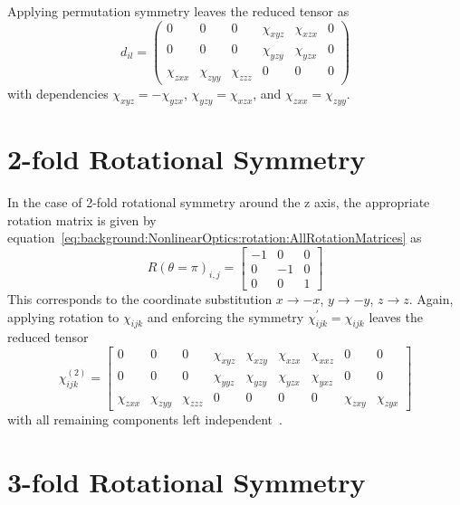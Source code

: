 Applying permutation symmetry leaves the reduced tensor as
\begin{equation}\label{eq:Reduced4fold}
	d_{il} = 
	\begin{pmatrix}
		0 & 0 & 0 & \chi_{xyz} & \chi_{xzx} & 0\\ 
		0 & 0 & 0 & \chi_{yzy} & \chi_{yzx} & 0\\ 
		\chi_{zxx} & \chi_{zyy} & \chi_{zzz} & 0 & 0 & 0
	\end{pmatrix} 
\end{equation}
with dependencies $\chi_{xyz} = -\chi_{yzx}$, $\chi_{yzy} = \chi_{xzx}$, and $\chi_{zxx} = \chi_{zyy}$.


\section{2-fold Rotational Symmetry}\label{sec:appendix:rotations:2foldrot}

In the case of 2-fold rotational symmetry around the z axis, the appropriate rotation matrix is given by equation~\ref{eq:background:NonlinearOptics:rotation:AllRotationMatrices} as
\begin{equation}\label{eq:piRotationMatrix}
	R(\theta=\pi)_{i,j} =
	\begin{bmatrix}
		-1 & 0 & 0\\ 
		0 & -1 & 0\\ 
		0 & 0 & 1
	\end{bmatrix}
\end{equation}
This corresponds to the coordinate substitution $x\rightarrow-x$, $y\rightarrow-y$, $z\rightarrow z$. Again, applying rotation to $\chi_{ijk}$ and enforcing the symmetry $\chi_{ijk}^{\prime}=\chi_{ijk}$ leaves the reduced tensor
\begin{equation}\label{eq:2foldChi}
	\chi^{(2)}_{ijk} =
	\begin{bmatrix}
		0 & 0 & 0 & \chi_{xyz} & \chi_{xzy} & \chi_{xzx} & \chi_{xxz} & 0 & 0\\ 
		0 & 0 & 0 & \chi_{yyz} & \chi_{yzy} & \chi_{yzx} & \chi_{yxz} & 0 & 0\\ 
		\chi_{zxx} & \chi_{zyy} & \chi_{zzz} & 0 & 0 & 0 & 0 & \chi_{zxy} & \chi_{zyx}
	\end{bmatrix}
\end{equation}
with all remaining components left independent~\cite{Boyd2008a}. 

\section{3-fold Rotational Symmetry}\label{sec:appendix:rotations:3foldrot}

